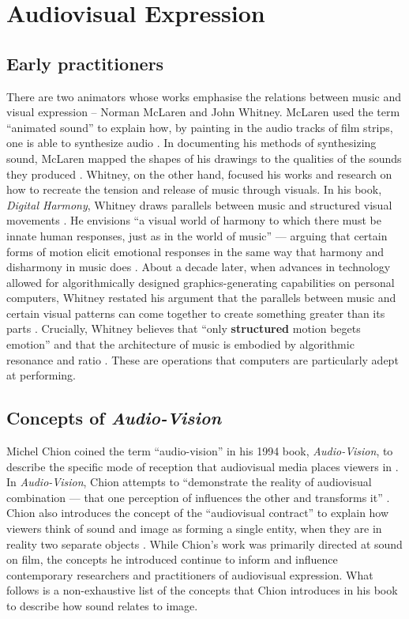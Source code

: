 \documentclass[../initial_thesis.tex]{subfiles}
\begin{document}
\section{Audiovisual Expression}
\subsection{Early practitioners}
There are two animators whose works emphasise the relations between music and visual expression -- Norman McLaren and John Whitney. McLaren used the term ``animated sound'' to explain how, by painting in the audio tracks of film strips, one is able to synthesize audio \cite{McLaren1953}. In documenting his methods of synthesizing sound, McLaren mapped the shapes of his drawings to the qualities of the sounds they produced \cite{McLaren1953}. Whitney, on the other hand, focused his works and research on how to recreate the tension and release of music through visuals. In his book, \textit{Digital Harmony}, Whitney draws parallels between music and structured visual movements \cite{Whitney1980}. He envisions ``a visual world of harmony to which there must be innate human responses, just as in the world of music'' --- arguing that certain forms of motion elicit emotional responses in the same way that harmony and disharmony in music does \cite{Whitney1980}. About a decade later, when advances in technology allowed for algorithmically designed graphics-generating capabilities on personal computers, Whitney restated his argument that the parallels between music and certain visual patterns can come together to create something greater than its parts \cite{Whitney1991}. Crucially, Whitney believes that ``only \textbf{structured} motion begets emotion'' \cite{Whitney1980} and that the architecture of music is embodied by algorithmic resonance and ratio \cite{Whitney1991}. These are operations that computers are particularly adept at performing. \par

\subsection{Concepts of \textit{Audio-Vision}}
Michel Chion coined the term ``audio-vision'' in his 1994 book, \textit{Audio-Vision}, to describe the specific mode of reception that audiovisual media places viewers in \cite{Chion1994}. In \textit{Audio-Vision}, Chion attempts to ``demonstrate the reality of audiovisual combination --- that one perception of influences the other and transforms it'' \cite{Chion1994}. Chion also introduces the concept of the ``audiovisual contract'' to explain how viewers think of sound and image as forming a single entity, when they are in reality two separate objects \cite{Chion1994}. While Chion's work was primarily directed at sound on film, the concepts he introduced continue to inform and influence contemporary researchers and practitioners of audiovisual expression. What follows is a non-exhaustive list of the concepts that Chion introduces in his book to describe how sound relates to image.
\end{document}

